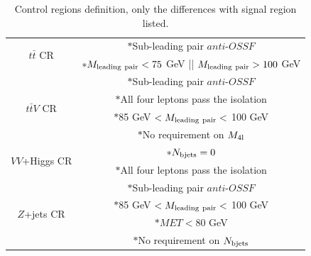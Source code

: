 \begin{table}[H]
\begin{center}
\caption{Control regions definition, only the differences with signal region listed.}
\label{Tab.CRs summary}
	\begin{tabular}{c|c}
		\toprule
		\toprule
		\multirow{2}{*}{$t\bar{t}$ CR}&$\ast$Sub-leading pair $anti$-$OSSF$\\
		&$\ast{M_{\rm leading\ pair}<75}$ GeV || $M_{\rm leading\ pair}>100$ GeV\\
		\midrule
		\multirow{4}{*}{$t\bar{t}V$ CR}&$\ast$Sub-leading pair $anti$-$OSSF$\\
		&$\ast$All four leptons pass the isolation\\
		&$\ast$85 GeV $<M_{\rm leading\ pair}<$ 100 GeV\\
		&$\ast$No requirement on $M_{\rm 4l}$\\
		\midrule
		\multirow{2}{*}{$VV$+Higgs CR}&$\ast{N_{\rm bjets}=0}$\\
		&$\ast$All four leptons pass the isolation\\
		\midrule
		\multirow{4}{*}{$Z$+jets CR}&$\ast$Sub-leading pair $anti$-$OSSF$\\
		&$\ast$85 GeV $<M_{\rm leading\ pair}<$ 100 GeV\\
		&$\ast{MET<80}$ GeV\\
		&$\ast$No requirement on $N_{\rm bjets}$\\
		\bottomrule
		\bottomrule
	\end{tabular}
\end{center}
\end{table}

